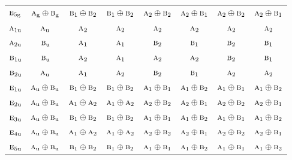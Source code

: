 \documentclass[10pt,a4paper]{article}
\numberwithin{equation}{section}
\newcommand{\irr}[1]{\text{\normalfont\scshape #1}}
\newcommand{\ptag}[1]{\mathrm{#1}}
\begin{document}
{\begin{longtable}{@{}lccccccc@{}}
$\irr{e}_{5\ptag{g}}$ & $\irr{a}_{\ptag{g}}\oplus \irr{b}_{\ptag{g}}$ & $\irr{b}_{1}\oplus \irr{b}_{2}$ & $\irr{b}_{1}\oplus \irr{b}_{2}$ & $\irr{a}_{2}\oplus \irr{b}_{2}$ & $\irr{a}_{2}\oplus \irr{b}_{1}$ & $\irr{a}_{2}\oplus \irr{b}_{2}$ & $\irr{a}_{2}\oplus \irr{b}_{1}$\\
$\irr{a}_{1\ptag{u}}$ & $\irr{a}_{\ptag{u}}$ & $\irr{a}_{2}$ & $\irr{a}_{2}$ & $\irr{a}_{2}$ & $\irr{a}_{2}$ & $\irr{a}_{2}$ & $\irr{a}_{2}$\\
$\irr{a}_{2\ptag{u}}$ & $\irr{b}_{\ptag{u}}$ & $\irr{a}_{1}$ & $\irr{a}_{1}$ & $\irr{b}_{2}$ & $\irr{b}_{1}$ & $\irr{b}_{2}$ & $\irr{b}_{1}$\\
$\irr{b}_{1\ptag{u}}$ & $\irr{b}_{\ptag{u}}$ & $\irr{a}_{2}$ & $\irr{a}_{1}$ & $\irr{a}_{2}$ & $\irr{a}_{2}$ & $\irr{b}_{2}$ & $\irr{b}_{1}$\\
$\irr{b}_{2\ptag{u}}$ & $\irr{a}_{\ptag{u}}$ & $\irr{a}_{1}$ & $\irr{a}_{2}$ & $\irr{b}_{2}$ & $\irr{b}_{1}$ & $\irr{a}_{2}$ & $\irr{a}_{2}$\\
$\irr{e}_{1\ptag{u}}$ & $\irr{a}_{\ptag{u}}\oplus \irr{b}_{\ptag{u}}$ & $\irr{b}_{1}\oplus \irr{b}_{2}$ & $\irr{b}_{1}\oplus \irr{b}_{2}$ & $\irr{a}_{1}\oplus \irr{b}_{1}$ & $\irr{a}_{1}\oplus \irr{b}_{2}$ & $\irr{a}_{1}\oplus \irr{b}_{1}$ & $\irr{a}_{1}\oplus \irr{b}_{2}$\\
$\irr{e}_{2\ptag{u}}$ & $\irr{a}_{\ptag{u}}\oplus \irr{b}_{\ptag{u}}$ & $\irr{a}_{1}\oplus \irr{a}_{2}$ & $\irr{a}_{1}\oplus \irr{a}_{2}$ & $\irr{a}_{2}\oplus \irr{b}_{2}$ & $\irr{a}_{2}\oplus \irr{b}_{1}$ & $\irr{a}_{2}\oplus \irr{b}_{2}$ & $\irr{a}_{2}\oplus \irr{b}_{1}$\\
$\irr{e}_{3\ptag{u}}$ & $\irr{a}_{\ptag{u}}\oplus \irr{b}_{\ptag{u}}$ & $\irr{b}_{1}\oplus \irr{b}_{2}$ & $\irr{b}_{1}\oplus \irr{b}_{2}$ & $\irr{a}_{1}\oplus \irr{b}_{1}$ & $\irr{a}_{1}\oplus \irr{b}_{2}$ & $\irr{a}_{1}\oplus \irr{b}_{1}$ & $\irr{a}_{1}\oplus \irr{b}_{2}$\\
$\irr{e}_{4\ptag{u}}$ & $\irr{a}_{\ptag{u}}\oplus \irr{b}_{\ptag{u}}$ & $\irr{a}_{1}\oplus \irr{a}_{2}$ & $\irr{a}_{1}\oplus \irr{a}_{2}$ & $\irr{a}_{2}\oplus \irr{b}_{2}$ & $\irr{a}_{2}\oplus \irr{b}_{1}$ & $\irr{a}_{2}\oplus \irr{b}_{2}$ & $\irr{a}_{2}\oplus \irr{b}_{1}$\\
$\irr{e}_{5\ptag{u}}$ & $\irr{a}_{\ptag{u}}\oplus \irr{b}_{\ptag{u}}$ & $\irr{b}_{1}\oplus \irr{b}_{2}$ & $\irr{b}_{1}\oplus \irr{b}_{2}$ & $\irr{a}_{1}\oplus \irr{b}_{1}$ & $\irr{a}_{1}\oplus \irr{b}_{2}$ & $\irr{a}_{1}\oplus \irr{b}_{1}$ & $\irr{a}_{1}\oplus \irr{b}_{2}$\\

\end{longtable}}
\end{document}
